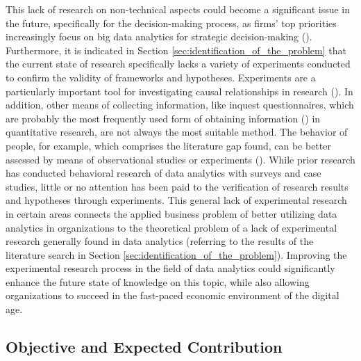 This lack of research on non-technical aspects could become a significant issue in the future, specifically for the decision-making process, as firms' top priorities increasingly focus on big data analytics for strategic decision-making (\cite{Ghasemaghaei.2019}). Furthermore, it is indicated in Section \ref{sec:identification_of_the_problem} that the current state of research specifically lacks a variety of experiments conducted to confirm the validity of frameworks and hypotheses. Experiments are a particularly important tool for investigating causal relationships in research (\cite{Gniewosz.2011}). In addition, other means of collecting information, like inquest questionnaires, which are probably the most frequently used form of obtaining information (\cite{Mummendey.2014}) in quantitative research, are not always the most suitable method. The behavior of people, for example, which comprises the literature gap found, can be better assessed by means of observational studies or experiments (\cite{Gniewosz.2011}). While prior research has conducted behavioral research of data analytics with surveys and case studies, little or no attention has been paid to the verification of research results and hypotheses through experiments. This general lack of experimental research in certain areas connects the applied business problem of better utilizing data analytics in organizations to the theoretical problem of a lack of experimental research generally found in data analytics (referring to the results of the literature search in Section \ref{sec:identification_of_the_problem}). Improving the experimental research process in the field of data analytics could significantly enhance the future state of knowledge on this topic, while also allowing organizations to succeed in the fast-paced economic environment of the digital age.



\subsection{Objective and Expected Contribution}

